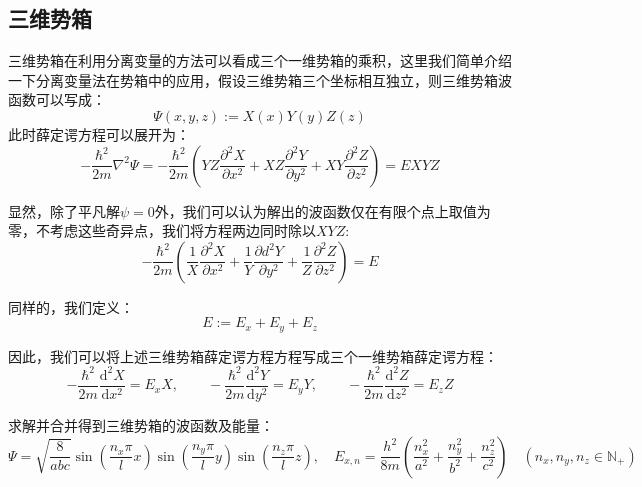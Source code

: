 \subsection{三维势箱}
三维势箱在利用分离变量的方法可以看成三个一维势箱的乘积，这里我们简单介绍一下分离变量法在势箱中的应用，假设三维势箱三个坐标相互独立，则三维势箱波函数可以写成：
\[\varPsi(x,y,z):=X(x)Y(y)Z(z)\]
此时薛定谔方程可以展开为：
\[-\frac{\hbar^2}{2m}\nabla^2\varPsi=-\frac{\hbar^2}{2m}\left (YZ\frac{\partial^2X}{\partial x^2}+XZ\frac{\partial^2Y}{\partial y^2}+XY\frac{\partial^2Z}{\partial z^2} \right )=EXYZ\]

显然，除了平凡解$\psi=0$外，我们可以认为解出的波函数仅在有限个点上取值为零，不考虑这些奇异点，我们将方程两边同时除以$XYZ$:
\[-\frac{\hbar^2}{2m}\left (\frac{1}{X}\frac{\partial^2X}{\partial x^2}+\frac{1}{Y}\frac{\partial{d}^2Y}{\partial y^2}+\frac{1}{Z}\frac{\partial^2Z}{\partial z^2} \right )=E\]

同样的，我们定义：
\[E:=E_x+E_y+E_z\]

因此，我们可以将上述三维势箱薛定谔方程方程写成三个一维势箱薛定谔方程：
\[-\frac{\hbar^2}{2m}\frac{\mathrm{d}^2X}{\mathrm{d}x^2}=E_xX, \qquad -\frac{\hbar^2}{2m}\frac{\mathrm{d}^2Y}{\mathrm{d}y^2}=E_yY, \qquad -\frac{\hbar^2}{2m}\frac{\mathrm{d}^2Z}{\mathrm{d}z^2}=E_zZ\]

求解并合并得到三维势箱的波函数及能量：
\[\varPsi=\sqrt{\frac{8}{abc}}\sin\left (\frac{n_x \pi}{l}x \right )\sin\left (\frac{n_y \pi}{l}y \right )\sin\left (\frac{n_z \pi}{l}z \right ), \quad E_{x,n}=\frac{h^2}{8m} \left (\frac{n_x^2}{a^2}+\frac{n_y^2}{b^2}+\frac{n_z^2}{c^2} \right ) \quad (n_x,n_y,n_z \in \mathbb{N}_+)\]

\newpage
